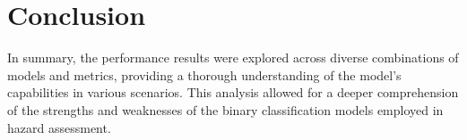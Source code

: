 \chapter{Conclusion}


In summary, the performance results were explored across diverse combinations of models and metrics, providing a thorough understanding of the model's capabilities in various scenarios. This analysis allowed for a deeper comprehension of the strengths and weaknesses of the binary classification models employed in hazard assessment.